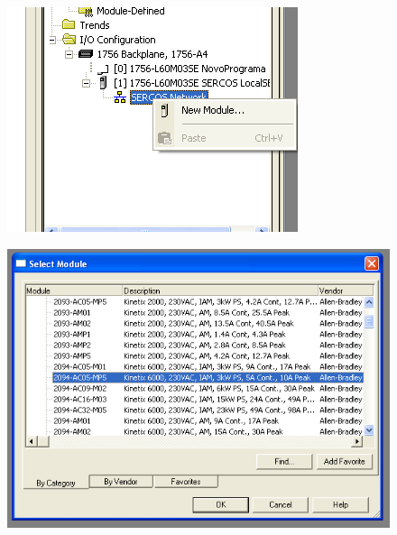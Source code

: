 \documentclass[a4paper,11pt]{scrartcl} %
\numberwithin{equation}{section} %
\numberwithin{figure}{section} %
\numberwithin{table}{section} %
\begin{document}
\begin{enumerate}
\begin{minipage}[!ht]{\linewidth}
      \centering
      \begin{minipage}{0.45\linewidth}
          \begin{figure}[H]
              \includegraphics[width=\linewidth]{figures/software/step02}
          \end{figure}
      \end{minipage}
      \hspace{0.05\linewidth}
      \begin{minipage}{0.45\linewidth}
          \begin{figure}[H]
              \includegraphics[width=\linewidth]{figures/software/step03}
          \end{figure}

\end{minipage}
\end{minipage}
\end{enumerate}
\end{document}
